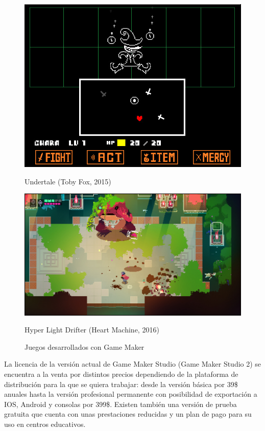 \begin{figure}[!htb]
   \begin{minipage}{0.5\textwidth}
     \centering
     \includegraphics[width=0.85\linewidth, right]{images/estadodelarte/motores/undertale}
     \caption{Undertale (Toby Fox, 2015)}
   \end{minipage}\hfill
   \begin {minipage}{0.5\textwidth}
     \centering
     \includegraphics[width=0.85\linewidth, left]{images/estadodelarte/motores/hyper-light-drifter}
     \caption{Hyper Light Drifter (Heart Machine, 2016)}
   \end{minipage}
   \caption{Juegos desarrollados con Game Maker}
\end{figure}

La licencia de la versión actual de Game Maker Studio (Game Maker Studio 2) se encuentra a la venta por distintos precios dependiendo de la plataforma de distribución para la que se quiera trabajar: desde la versión básica por 39\$ anuales hasta la versión profesional permanente con posibilidad de exportación a IOS, Android y consolas por 399\$. Existen también una versión de prueba gratuita que cuenta con unas prestaciones reducidas y un plan de pago para su uso en centros educativos.
